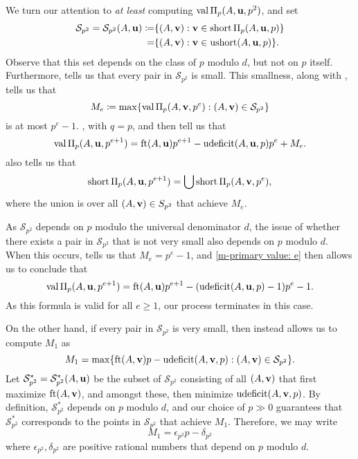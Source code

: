 \documentclass[11pt]{amsart}
\newcommand{\short}{\operatorname{short}}
\newcommand{\ushort}{\operatorname{ushort}}
\newcommand{\udeficit}{\operatorname{udeficit}}
\newcommand{\denom}{d}
\renewcommand{\S}{\mathcal{S}}
\begin{document}
We turn our attention to \emph{at least} computing $\operatorname{val} \Pi_p(A,\mathbf{u},p^2)$, and set
%
\begin{align*}
 \S_{p^2} = \S_{p^2}(A,\vv{u}) \coloneqq& \{ (A,\vv{v}) : \vv{v} \in \short \IP_{p}(A,\vv{u},p) \} \\
 =& \{ (A,\vv{v}) : \vv{v} \in \ushort(A,\vv{u},p)\}.
\end{align*}  
Observe that this set depends on the class of $p$ modulo $\denom$, but not on $p$ itself.  Furthermore,  tells us that every pair in $\S_{p^2}$ is small.
This smallness, along with , tells us that
\[ M_e \coloneqq \max \{ \val \IP_p(A, \vv{v}, p^e) :  (A,\vv{v}) \in \S_{p^2} \}\]
is at most $p^e-1$.
, with $q=p$, and  then tell us that
%
\begin{equation}
\label{m-primary value: e}
 \val \IP_p(A,\vv{u},p^{e+1}) = \ft{A}{\vv{u}}p^{e+1} - \udeficit(A,\vv{u},p)p^e + M_e.
 \end{equation}
% 
 also tells us that
%
\begin{equation}
\label{m-primary shortfall: e}
\short \IP_p(A,\vv{u},p^{e+1}) = \bigcup \short \IP_p(A,\vv{v}, p^e),
\end{equation}
%
where the union is over all $(A,\vv{v}) \in \mathcal\S_{p^2}$ that achieve $M_e$.

As $\S_{p^2}$ depends on $p$ modulo the universal denominator $\denom$, the issue of whether there exists a pair in $\S_{p^2}$ that is not very small also depends on $p$ modulo $\denom$.  When this occurs,  tells us that $M_e = p^e-1$, and \eqref{m-primary value: e} then allows us to conclude that 
%
\[ \val \IP_p(A,\vv{u},p^{e+1})  = \ft{A}{\vv{u}} p^{e+1}-(\udeficit(A,\vv{u},p)-1)p^e-1.  \]
%
As this formula is valid for all $e \geq 1$, our process terminates in this case.

On the other hand, if every pair in $\S_{p^2}$ is very small, then  instead allows us to compute $M_1$ as 
\[ M_1 = \max \{ \ft{A}{\vv{v}}p-\udeficit(A,\vv{v},p) : (A,\vv{v}) \in \S_{p^2}\}. \] 
Let $\S_{p^2}^{\ast} = \S_{p^2}^{\ast}(A,\vv{u})$ be the subset of $\S_{p^2}$ consisting of all $(A,\mathbf{v})$ that first maximize $\operatorname{ft}(A, \mathbf{v})$, and amongst these, then minimize $\udeficit(A,\vv{v},p)$.
By definition, $\S_{p^2}^{\ast}$ depends on $p$ modulo $\denom$, and our choice of $p \gg 0$ guarantees that $\S_{p^2}^{\ast}$ corresponds to the points in $\S_{p^2}$ that achieve $M_1$.
Therefore, we may write \[ M_1 = \epsilon_{p^2} p - \delta_{p^2}\]  where $\epsilon_{p^2},\delta_{p^2}$ are positive rational numbers that depend on $p$ modulo $\denom$.
\end{document}
